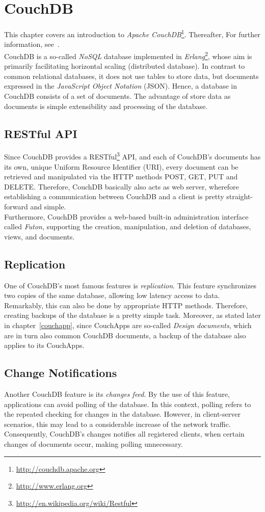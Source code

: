 \chapter{CouchDB}
\label{couchdb}
This chapter covers an introduction to \emph{Apache CouchDB}\footnote{\url{http://couchdb.apache.org}}. Thereafter,  For further information, see~\cite{Anderson10}.\\
CouchDB is a so-called \emph{NoSQL} database implemented in \emph{Erlang}\footnote{\url{http://www.erlang.org}}, whose aim is primarily facilitating horizontal scaling (distributed database). In contrast to common relational databases, it does not use tables to store data, but documents expressed in the \emph{JavaScript Object Notation} (JSON). Hence, a database in CouchDB consists of a set of documents. The advantage of store data as documents is simple extensibility and processing of the database.

\section{RESTful API}
\label{couchdb:restfulapi}
Since CouchDB provides a RESTful\footnote{\url{http://en.wikipedia.org/wiki/Restful}} API, and each of CouchDB's documents has its own, unique Uniform Resource Identifier (URI), every document can be retrieved and manipulated via the HTTP methods POST, GET, PUT and DELETE. Therefore, CouchDB basically also acts as web server, wherefore establishing a communication between CouchDB and a client is pretty straight-forward and simple.\\
Furthermore, CouchDB provides a web-based built-in administration interface called \emph{Futon}, supporting the creation, manipulation, and deletion of databases, views, and documents.

\section{Replication}
One of CouchDB's most famous features is \emph{replication}. This feature synchronizes two copies of the same database, allowing low latency access to data. Remarkably, this can also be done by appropriate HTTP methods. Therefore, creating backups of the database is a pretty simple task. Moreover, as stated later in chapter~\ref{couchapp}, since CouchApps are so-called \emph{Design documents}, which are in turn also common CouchDB documents, a backup of the database also applies to its CouchApps.

\section{Change Notifications}
\label{couchdb:changesfeed}
Another CouchDB feature is its \emph{changes feed}. By the use of this feature, applications can avoid polling of the database. In this context, polling refers to the repeated checking for changes in the database. However, in client-server scenarios, this may lead to a considerable increase of the network traffic.\\
Consequently, CouchDB's changes notifies all registered clients, when certain changes of documents occur, making polling unnecessary.

